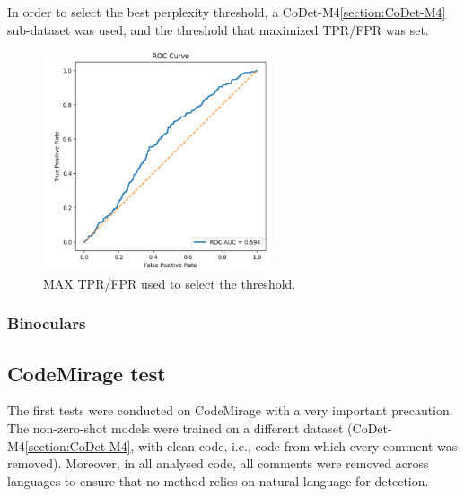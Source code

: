 In order to select the best perplexity threshold, 
a CoDet-M4\ref{section:CoDet-M4} sub-dataset was used, and the threshold that 
maximized TPR/FPR was set.


\begin{figure}[H]
    \centering
    \includegraphics[width=0.6\textwidth]{img/LLMPPL/AUC.png}
    \caption{MAX TPR/FPR used to select the threshold.}
    \label{fig:TPR/FPR used to select the threshold.}
\end{figure}



\subsubsection{Binoculars}










\subsection{CodeMirage test}
The first tests were conducted on CodeMirage with a very important 
precaution. The non-zero-shot models were trained on a different dataset 
(CoDet-M4\ref{section:CoDet-M4}, with clean code, i.e., code from which every 
comment was removed). Moreover, in all analysed code, all comments were 
removed across languages to ensure that no method relies on natural 
language for detection.



